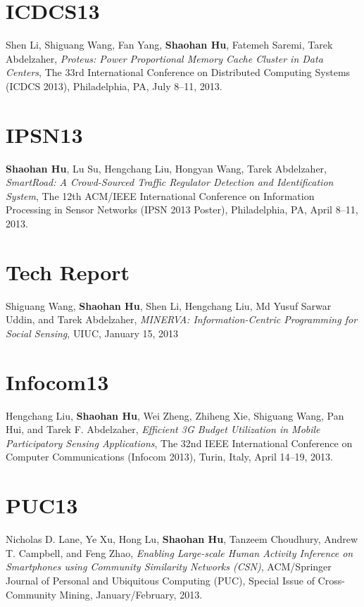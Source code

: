 \section{\sc ICDCS13}
Shen Li, Shiguang Wang, Fan Yang, \textbf{Shaohan Hu}, Fatemeh Saremi,
Tarek Abdelzaher, \emph{Proteus: Power Proportional Memory Cache
  Cluster in Data Centers}, \textsf{The 33rd International Conference
  on Distributed Computing Systems (ICDCS 2013)}, Philadelphia, PA,
July 8--11, 2013.

\section{\sc IPSN13}
\textbf{Shaohan Hu}, Lu Su, Hengchang Liu, Hongyan Wang, Tarek
Abdelzaher, \emph{SmartRoad: A Crowd-Sourced Traffic Regulator
  Detection and Identification System}, \textsf{The 12th ACM/IEEE
  International Conference on Information Processing in Sensor
  Networks (IPSN 2013 Poster)}, Philadelphia, PA, April 8--11, 2013.

\section{\sc Tech Report}
Shiguang Wang, \textbf{Shaohan Hu}, Shen Li, Hengchang Liu, Md Yusuf
Sarwar Uddin, and Tarek Abdelzaher, \emph{MINERVA: Information-Centric
  Programming for Social Sensing}, \textsf{UIUC}, January 15, 2013

\section{\sc Infocom13}
Hengchang Liu, \textbf{Shaohan Hu}, Wei Zheng, Zhiheng Xie, Shiguang
Wang, Pan Hui, and Tarek F. Abdelzaher, \emph{Efficient 3G Budget
  Utilization in Mobile Participatory Sensing Applications},
\textsf{The 32nd IEEE International Conference on Computer
  Communications (Infocom 2013)}, Turin, Italy, April 14--19, 2013.

\section{\sc PUC13}
Nicholas D. Lane, Ye Xu, Hong Lu, \textbf{Shaohan Hu}, Tanzeem
Choudhury, Andrew T. Campbell, and Feng Zhao, \emph{Enabling
  Large-scale Human Activity Inference on Smartphones using Community
  Similarity Networks (CSN)}, \textsf{ACM/Springer Journal of Personal
  and Ubiquitous Computing (PUC), Special Issue of Cross-Community
  Mining}, January/February, 2013.

